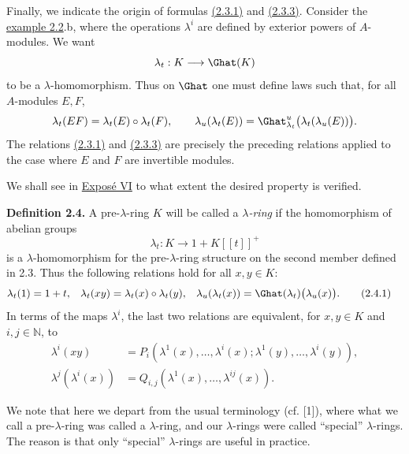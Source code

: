 Finally, we indicate the origin of formulas \hyperlink{sga6.e05.eq.2-3-1}{(2.3.1)} and \hyperlink{sga6.e05.eq.2-3-3}{(2.3.3)}. Consider the \hyperlink{sga6.e05.ex.2-2}{example 2.2}.b, where the operations \(\lambda^i\) are defined by exterior powers of \(A\)-modules. We want
\[
  \lambda_t:K\longrightarrow \Ghat(K)
\]
to be a \(\lambda\)-homomorphism. Thus on \(\Ghat\) one must define laws such that, for all \(A\)-modules \(E,F\),
\[
  \lambda_t(EF)=\lambda_t(E)\circ\lambda_t(F),\qquad
  \lambda_u(\lambda_t(E))=\Ghat^u_{\lambda_t}\bigl(\lambda_t(\lambda_u(E))\bigr).
\]
The relations \hyperlink{sga6.e05.eq.2-3-1}{(2.3.1)} and \hyperlink{sga6.e05.eq.2-3-3}{(2.3.3)} are precisely the preceding relations applied to the case where \(E\) and \(F\) are invertible modules.

We shall see in \hyperlink{sga6.e06.expose}{Exposé VI} to what extent the desired property is verified.

\textbf{Definition 2.4.} A pre-\(\lambda\)-ring \(K\) will be called a \emph{\(\lambda\)-ring} if the homomorphism of abelian groups
\[
  \lambda_t:K\longrightarrow 1+K[[t]]^+
\]
is a \(\lambda\)-homomorphism for the pre-\(\lambda\)-ring structure on the second member defined in 2.3. Thus the following relations hold for all \(x,y\in K\):
\begin{align}
  \lambda_t(1)&=1+t,&
  \lambda_t(xy)&=\lambda_t(x)\circ\lambda_t(y),&
  \lambda_u(\lambda_t(x))&=\Ghat(\lambda_t)\bigl(\lambda_u(x)\bigr).
  \tag{2.4.1}
\end{align}
In terms of the maps \(\lambda^i\), the last two relations are equivalent, for \(x,y\in K\) and \(i,j\in\mathbb N\), to
\begin{align}
  \lambda^i(xy)
  &=P_i(\lambda^1(x),\ldots,\lambda^i(x);
       \lambda^1(y),\ldots,\lambda^i(y)), \tag{2.4.2}\\
  \lambda^j(\lambda^i(x))
  &=Q_{i,j}(\lambda^1(x),\ldots,\lambda^{ij}(x)). \tag{2.4.3}
\end{align}

We note that here we depart from the usual terminology (cf. [1]), where what we call a pre-\(\lambda\)-ring was called a \(\lambda\)-ring, and our \(\lambda\)-rings were called ``special'' \(\lambda\)-rings. The reason is that only ``special'' \(\lambda\)-rings are useful in practice.

